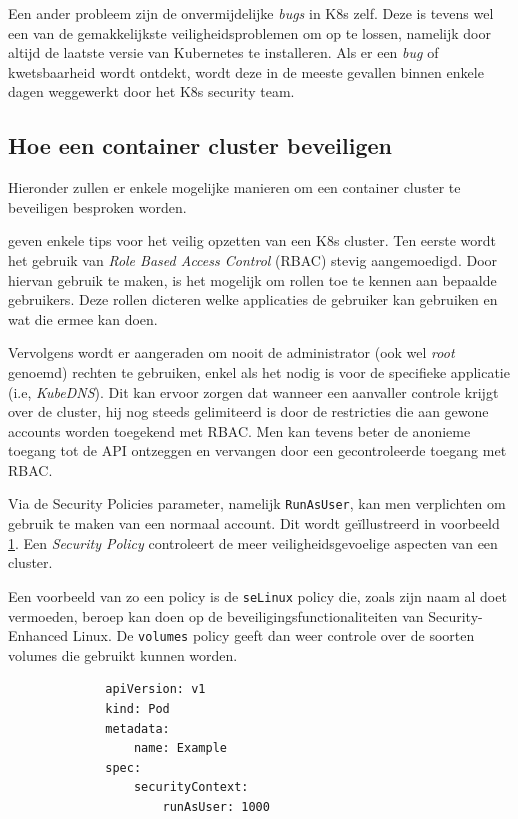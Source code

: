 Een ander probleem zijn de onvermijdelijke \textit{bugs} in K8s zelf. Deze is tevens wel een van de gemakkelijkste veiligheidsproblemen om op te lossen, namelijk door altijd de laatste versie van Kubernetes te installeren. Als er een \textit{bug} of kwetsbaarheid wordt ontdekt, wordt deze in de meeste gevallen binnen enkele dagen weggewerkt door het K8s security team.

\subsection{Hoe een container cluster beveiligen}
Hieronder zullen er enkele mogelijke manieren om een container cluster te beveiligen besproken worden.

\textcite{Rice2019, Lewis2019} geven enkele tips voor het veilig opzetten van een K8s cluster. Ten eerste wordt het gebruik van \textit{Role Based Access Control} (RBAC) stevig aangemoedigd. Door hiervan gebruik te maken, is het mogelijk om rollen toe te kennen aan bepaalde gebruikers. Deze rollen dicteren welke applicaties de gebruiker kan gebruiken en wat die ermee kan doen.

Vervolgens wordt er aangeraden om nooit de administrator (ook wel \textit{root} genoemd) rechten te gebruiken, enkel als het nodig is voor de specifieke applicatie (i.e, \textit{KubeDNS}). Dit kan ervoor zorgen dat wanneer een aanvaller controle krijgt over de cluster, hij nog steeds gelimiteerd is door de restricties die aan gewone accounts worden toegekend met RBAC. Men kan tevens beter de anonieme toegang tot de API ontzeggen en vervangen door een gecontroleerde toegang met RBAC.

Via de Security Policies parameter, namelijk \verb|RunAsUser|, kan men verplichten om gebruik te maken van een normaal account. Dit wordt geïllustreerd in voorbeeld \ref{runasuser}. Een \textit{Security Policy} controleert de meer veiligheidsgevoelige aspecten van een cluster. 

Een voorbeeld van zo een policy is de \verb|seLinux| policy die, zoals zijn naam al doet vermoeden, beroep kan doen op de beveiligingsfunctionaliteiten van Security-Enhanced Linux. De \verb|volumes| policy geeft dan weer controle over de soorten volumes die gebruikt kunnen worden.

\begin{figure}[h!] \label{runasuser}
    \begin{verbatim}
        apiVersion: v1
        kind: Pod
        metadata:
            name: Example
        spec:
            securityContext:
                runAsUser: 1000
    \end{verbatim}
\end{figure}

